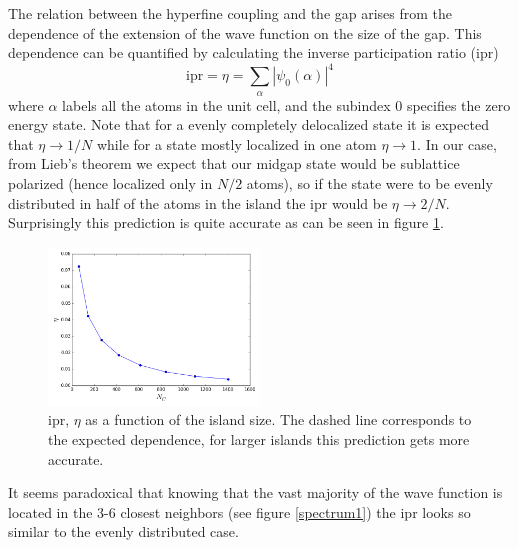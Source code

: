 The relation between the hyperfine coupling and the gap arises from the dependence of the extension of the  wave function on the size of the gap. This dependence can be quantified by calculating the inverse participation ratio (ipr)
\begin{equation}
  \text{ipr} = \eta = \displaystyle\sum_{\alpha}|\psi_{0}(\alpha)|^4
\end{equation}
where $\alpha$ labels all the atoms  in the unit cell, and the subindex $0$ specifies the zero energy state. Note that for a evenly completely delocalized state it is expected that $\eta\rightarrow1/N$ while for a state mostly localized in one atom $\eta\rightarrow1$. In our case, from Lieb's theorem we expect that our midgap state would be sublattice polarized (hence localized only in $N/2$ atoms), so if the state were to be evenly distributed in half of the atoms in the island the ipr would be $\eta\rightarrow2/N$. Surprisingly this prediction is quite accurate as can be seen in figure \ref{ipr}.
\begin{figure}
\centering
\includegraphics[width=0.5\textwidth]{chapter05/figures/ipr.png}
\caption{ ipr, $\eta$ as a function of the island size. The dashed line corresponds to the expected dependence, for larger islands this prediction gets more accurate.}
\label{ipr}
\end{figure}
\FloatBarrier
It seems paradoxical that knowing that the vast majority of the wave function is located in the 3-6 closest neighbors (see figure \ref{spectrum1}) the ipr looks so similar to the evenly distributed case.


